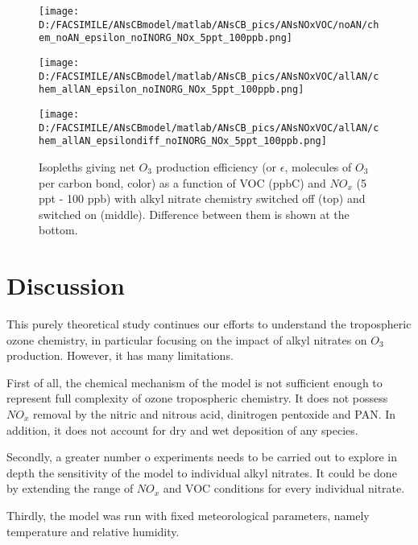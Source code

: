 \documentclass[11pt,a4paper]{article}
\begin{document}
\begin{figure} %
\centering
\begin{minipage}{.5\textwidth}
  \centering
  \texttt{[image: D:/FACSIMILE/ANsCBmodel/matlab/ANsCB\_pics/ANsNOxVOC/noAN/chem\_noAN\_epsilon\_noINORG\_NOx\_5ppt\_100ppb.png]}
\end{minipage}
\begin{minipage}{.5\textwidth}
  \centering
  \texttt{[image: D:/FACSIMILE/ANsCBmodel/matlab/ANsCB\_pics/ANsNOxVOC/allAN/chem\_allAN\_epsilon\_noINORG\_NOx\_5ppt\_100ppb.png]}
\end{minipage}
\begin{minipage}{.5\textwidth}
  \centering
  \texttt{[image: D:/FACSIMILE/ANsCBmodel/matlab/ANsCB\_pics/ANsNOxVOC/allAN/chem\_allAN\_epsilondiff\_noINORG\_NOx\_5ppt\_100ppb.png]}
\end{minipage}
\caption{Isopleths giving net $O_3$ production efficiency (or $\epsilon$, molecules of $O_3$ per carbon bond, color) as a function of VOC (ppbC) and $NO_x$ (5 ppt - 100 ppb) with alkyl nitrate chemistry switched off (top) and switched on (middle). Difference between them is shown at the bottom.}\label{fig:epsilon5ppt100ppb}
\end{figure}
\section{Discussion} \label{sec:discuss}
This purely theoretical study continues our efforts to understand the tropospheric ozone chemistry, in particular focusing on the impact of alkyl nitrates on $O_3$ production. However, it has many limitations.

First of all, the chemical mechanism of the model is not sufficient enough to represent full complexity of ozone tropospheric chemistry. It does not possess $NO_x$ removal by the nitric and nitrous acid, dinitrogen pentoxide and PAN. In addition, it does not account for dry and wet deposition of any species.

Secondly, a greater number o experiments needs to be carried out to explore in depth the sensitivity of the model to individual alkyl nitrates. It could be done by extending the range of $NO_x$ and VOC conditions for every individual nitrate.

Thirdly, the model was run with fixed meteorological parameters, namely temperature and relative humidity.
\end{document}
